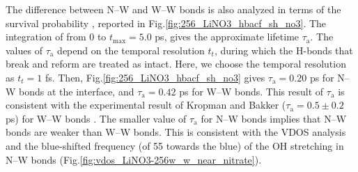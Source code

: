 %
The difference between N--W and W--W bonds 
is also analyzed in terms of the survival probability \SHB\cite{AKS86,JT90,AL96}, 
reported in Fig.\thinspace\ref {fig:256_LiNO3_hbacf_sh_no3}.
The integration of \SHB from 0 to $t_{\max}=5.0$ ps\cite{Steinel2004}, gives the approximate lifetime $\tau_\text{a}$\cite{Chowdhuri2002}. 
The values of $\tau_{\text{a}}$ depend on the temporal resolution $t_t$, during which the H-bonds that break and reform are treated as intact\cite{AL00}. 
%
Here, we choose the temporal resolution as $t_t=1$ fs. 
Then, Fig.\thinspace\ref {fig:256_LiNO3_hbacf_sh_no3} gives $\tau_\text{a}=0.20$ ps for N--W bonds at the interface, 
and $\tau_\text{a}=0.42$ ps for W--W bonds.
This result of $\tau_\text{a}$ is consistent with the experimental result of Kropman and Bakker ($\tau_\text{a}=0.5\pm0.2$ ps) for W--W bonds 
\cite{Kropman2001}. %
The smaller value of $\tau_\text{a}$ for N--W bonds implies that N--W bonds are weaker than W--W bonds. 
This is consistent with the VDOS analysis and the blue-shifted frequency (of 55 \cm towards the blue) of the OH stretching in N--W bonds 
(Fig.\thinspace\ref{fig:vdos_LiNO3-256w_w_near_nitrate}). 


\FloatBarrier

